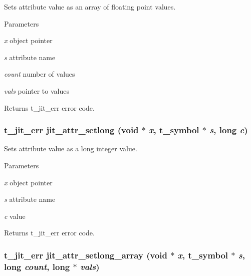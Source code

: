 Sets attribute value as an array of floating point values. 
\begin{DoxyParams}{Parameters}
\item[{\em x}]object pointer \item[{\em s}]attribute name \item[{\em count}]number of values \item[{\em vals}]pointer to values\end{DoxyParams}
\begin{DoxyReturn}{Returns}
t\_\-jit\_\-err error code. 
\end{DoxyReturn}
\hypertarget{group__attrmod_ga610b248e58c4026a004e73a6748715ca}{
\subsubsection[{jit\_\-attr\_\-setlong}]{\setlength{\rightskip}{0pt plus 5cm}t\_\-jit\_\-err jit\_\-attr\_\-setlong (void $\ast$ {\em x}, \/  {\bf t\_\-symbol} $\ast$ {\em s}, \/  long {\em c})}}
\label{group__attrmod_ga610b248e58c4026a004e73a6748715ca}


Sets attribute value as a long integer value. 
\begin{DoxyParams}{Parameters}
\item[{\em x}]object pointer \item[{\em s}]attribute name \item[{\em c}]value\end{DoxyParams}
\begin{DoxyReturn}{Returns}
t\_\-jit\_\-err error code. 
\end{DoxyReturn}
\hypertarget{group__attrmod_ga7251db8eacbe7da48ed8ba887dbca6c0}{
\subsubsection[{jit\_\-attr\_\-setlong\_\-array}]{\setlength{\rightskip}{0pt plus 5cm}t\_\-jit\_\-err jit\_\-attr\_\-setlong\_\-array (void $\ast$ {\em x}, \/  {\bf t\_\-symbol} $\ast$ {\em s}, \/  long {\em count}, \/  long $\ast$ {\em vals})}}
\label{group__attrmod_ga7251db8eacbe7da48ed8ba887dbca6c0}


